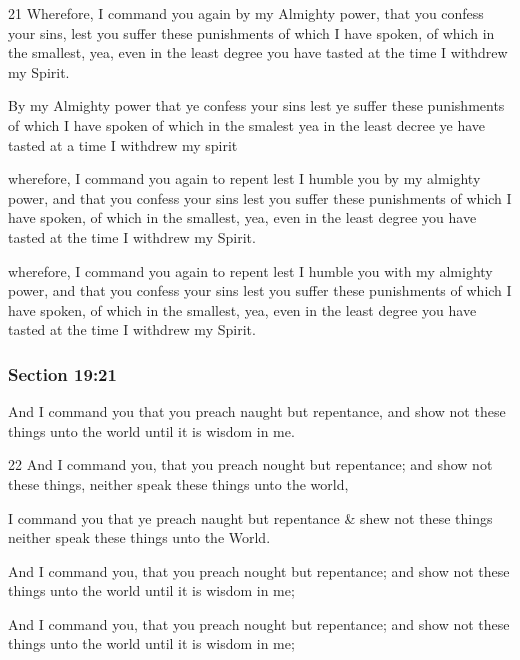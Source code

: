 		\begin{framed}
		\scriptsize
			\begin{compactdesc}
				\item[JSP] 21 Wherefore, I command you again by my Almighty power, that you confess your sins, lest you suffer these punishments of which I have spoken, of which in the smallest, yea, even in the least degree you have tasted at the time I withdrew my Spirit.
				\item[RB1] By my Almighty power that ye confess your sins lest ye suffer these punishments of which I have spoken of which in the smalest yea in the least decree ye have tasted at a time I withdrew my spirit
				\item[DC 1835] wherefore, I command you again to repent lest I humble you by my almighty power, and that you confess your sins lest you suffer these punishments of which I have spoken, of which in the smallest, yea, even in the least degree you have tasted at the time I withdrew my Spirit. 
				\item[DC 1844] wherefore, I command you again to repent lest I humble you with my almighty power, and that you confess your sins lest you suffer these punishments of which I have spoken, of which in the smallest, yea, even in the least degree you have tasted at the time I withdrew my Spirit. 
			\end{compactdesc}
		\end{framed}

	\subsubsection{Section 19:21} %
		\label{DC19-21}

		And I command you that you preach naught but repentance, and show not these things unto the world until it is wisdom in me.

		\begin{framed}
		\scriptsize
			\begin{compactdesc}
				\item[JSP] 22 And I command you, that you preach nought but repentance; and show not these things, neither speak these things unto the world,
				\item[RB1] I command you that ye preach naught but repentance \& shew not these things neither speak these things unto the World.
				\item[DC 1835] And I command you, that you preach nought but repentance; and show not these things unto the world until it is wisdom in me; 
				\item[DC 1844] And I command you, that you preach nought but repentance; and show not these things unto the world until it is wisdom in me; 
			\end{compactdesc}
		\end{framed}

